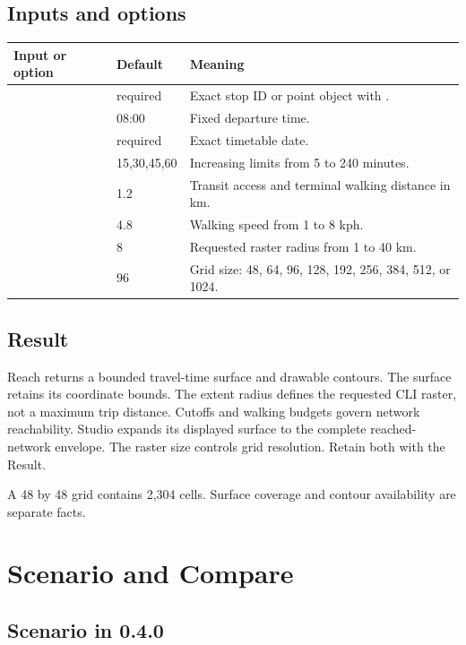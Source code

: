 \documentclass[10pt,letterpaper]{article}
\begin{document}
\subsection{Inputs and options}

\begin{longtable}{P{1.62in} P{1.08in} P{3.60in}}
\toprule
\textbf{Input or option} & \textbf{Default} & \textbf{Meaning} \\
\midrule
\endhead
{} & required & Exact stop ID or point object with . \\
 & 08:00 & Fixed departure time. \\
 & required & Exact timetable date. \\
 & 15,30,45,60 & Increasing limits from 5 to 240 minutes. \\
 & 1.2 & Transit access and terminal walking distance in km. \\
 & 4.8 & Walking speed from 1 to 8 kph. \\
 & 8 & Requested raster radius from 1 to 40 km. \\
 & 96 & Grid size: 48, 64, 96, 128, 192, 256, 384, 512, or 1024. \\
\bottomrule
\end{longtable}

\subsection{Result}

Reach returns a bounded travel-time surface and drawable contours. The surface retains its coordinate bounds. The extent radius defines the requested CLI raster, not a maximum trip distance. Cutoffs and walking budgets govern network reachability. Studio expands its displayed surface to the complete reached-network envelope. The raster size controls grid resolution. Retain both with the Result.

A 48 by 48 grid contains 2,304 cells. Surface coverage and contour availability are separate facts.

\section{Scenario and Compare}

\subsection{Scenario in 0.4.0}
\end{document}
